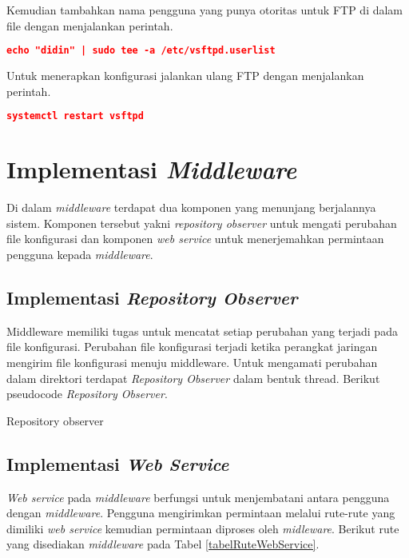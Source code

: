         Kemudian tambahkan nama pengguna yang punya otoritas untuk FTP di dalam file  dengan menjalankan perintah.
    \begin{lstlisting}[frame=single,tabsize=2,breaklines,caption={Pengguna FTP},label=nonrootuser, captionpos=b, language=json,numbers=none]
    echo "didin" | sudo tee -a /etc/vsftpd.userlist
    \end{lstlisting}
        Untuk menerapkan konfigurasi jalankan ulang FTP dengan menjalankan perintah.
    \begin{lstlisting}[frame=single,tabsize=2,breaklines,caption={Jalan ulang FTP},label=nonrootuser, captionpos=b, language=json,numbers=none]
    systemctl restart vsftpd
    \end{lstlisting}
        
    \section{Implementasi \textit{Middleware}}
    	Di dalam \textit{middleware }terdapat dua komponen yang menunjang berjalannya sistem. Komponen tersebut yakni \textit{repository observer} untuk mengati perubahan file konfigurasi dan komponen \textit{web service} untuk menerjemahkan permintaan pengguna kepada \textit{middleware}.
    	\subsection{Implementasi \textit{Repository Observer}}
    		Middleware memiliki tugas untuk mencatat setiap perubahan yang terjadi pada file konfigurasi. Perubahan file konfigurasi terjadi ketika perangkat jaringan mengirim file konfigurasi menuju middleware. Untuk mengamati perubahan dalam direktori terdapat \textit{Repository Observer} dalam bentuk thread. Berikut pseudocode \textit{Repository Observer}.
    		\begin{algorithm}[H]
    			\caption{Repository observer}
    		\end{algorithm}
    	\subsection{Implementasi \textit{Web Service}}
    		\textit{Web service} pada \textit{middleware} berfungsi untuk menjembatani antara pengguna dengan \textit{middleware}. Pengguna mengirimkan permintaan melalui rute-rute yang dimiliki \textit{web service} kemudian permintaan diproses oleh \textit{midleware}. Berikut rute yang disediakan \textit{middleware} pada Tabel \ref{tabelRuteWebService}.
    		
